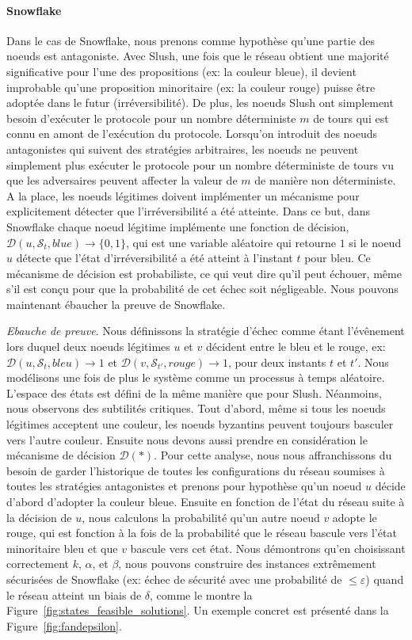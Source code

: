 \documentclass[letterpaper,twocolumn,10pt]{article}
\theoremstyle{definition}
\begin{document}
\paragraph{Snowflake}

Dans le cas de Snowflake, nous prenons comme hypothèse qu'une partie des noeuds est antagoniste. Avec Slush, une
fois que le réseau obtient une majorité significative pour l'une des propositions (ex: la couleur bleue), il devient
improbable qu'une proposition minoritaire (ex: la couleur rouge) puisse être adoptée dans le futur (irréversibilité).
De plus, les noeuds Slush ont simplement besoin d'exécuter le protocole pour un nombre déterministe $m$ de tours qui
est connu en amont de l'exécution du protocole. Lorsqu'on introduit des noeuds antagonistes qui suivent des stratégies
arbitraires, les noeuds ne peuvent simplement plus exécuter le protocole pour un nombre déterministe de tours vu que
les adversaires peuvent affecter la valeur de $m$ de manière non déterministe. A la place, les noeuds légitimes doivent
implémenter un mécanisme pour explicitement détecter que l'irréversibilité a été atteinte. Dans ce but, dans Snowflake
chaque noeud légitime implémente une fonction de décision, $\mathcal{D}(u, \mathcal{S}_t, blue) \rightarrow \{0, 1\}$,
qui est une variable aléatoire qui retourne $1$ si le noeud $u$ détecte que l'état d'irréversibilité a été atteint à
l'instant $t$ pour bleu. Ce mécanisme de décision est probabiliste, ce qui veut dire qu'il peut échouer, même s'il est
conçu pour que la probabilité de cet échec soit négligeable. Nous pouvons maintenant ébaucher la preuve de Snowflake.

\noindent \emph{Ebauche de preuve}. Nous définissons la stratégie d'échec comme étant l'évênement lors duquel deux
noeuds légitimes $u$ et $v$ décident entre le bleu et le rouge, ex: $\mathcal{D}(u, \mathcal{S}_t, bleu) \rightarrow 1$
et $\mathcal{D}(v, \mathcal{S}_{t'}, rouge) \rightarrow 1$, pour deux instants $t$ et $t'$. Nous modélisons une fois de
plus le système comme un processus à temps aléatoire. L'espace des états est défini de la même manière que pour Slush.
Néanmoins, nous observons des subtilités critiques. Tout d'abord, même si tous les noeuds légitimes acceptent une
couleur, les noeuds byzantins peuvent toujours basculer vers l'autre couleur. Ensuite nous devons aussi prendre en
considération le mécanisme de décision $\mathcal{D}(*)$. Pour cette analyse, nous nous affranchissons du besoin de
garder l'historique de toutes les configurations du réseau soumises à toutes les stratégies antagonistes et prenons pour
hypothèse qu'un noeud $u$ décide d'abord d'adopter la couleur bleue. Ensuite en fonction de l'état du réseau suite à la
décision de $u$, nous calculons la probabilité qu'un autre noeud $v$ adopte le rouge, qui est fonction à la fois de la
probabilité que le réseau bascule vers l'état minoritaire bleu et que $v$ bascule vers cet état.
Nous démontrons qu'en choisissant correctement $k$, $\alpha$, et $\beta$, nous pouvons construire des instances
extrêmement sécurisées de Snowflake (ex: échec de sécurité avec une probabilité de $\leq \varepsilon$) quand le réseau
atteint un biais de $\delta$, comme le montre la Figure~\ref{fig:states_feasible_solutions}. Un exemple concret est
présenté dans la Figure~\ref{fig:fandepsilon}.
\end{document}
